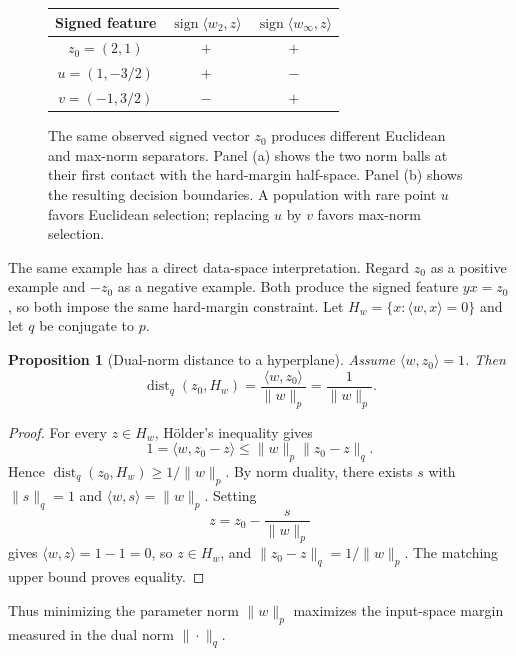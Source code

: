 \documentclass[11pt,twoside]{article}
\newcommand{\sign}{\operatorname{sign}}
\newtheorem{proposition}[theorem]{Proposition}
\theoremstyle{definition}
\theoremstyle{remark}
\begin{document}
\begin{figure}[H]
\begin{tabular}{c@{\qquad}cc}
\toprule
Signed feature & $\sign\langle w_2,z\rangle$
               & $\sign\langle w_\infty,z\rangle$\\
\midrule
$z_0=(2,1)$ & $+$ & $+$\\
$u=(1,-3/2)$ & $+$ & $-$\\
$v=(-1,3/2)$ & $-$ & $+$\\
\bottomrule
\end{tabular}
\caption{The same observed signed vector $z_0$ produces different
Euclidean and max-norm separators. Panel (a) shows the two norm balls at their
first contact with the hard-margin half-space. Panel (b) shows the resulting
decision boundaries. A population with rare point $u$ favors Euclidean
selection; replacing $u$ by $v$ favors max-norm selection.}
\label{fig:two-dimensional-reversal}
\end{figure}

The same example has a direct data-space interpretation. Regard $z_0$ as a
positive example and $-z_0$ as a negative example. Both produce the signed
feature $yx=z_0$, so both impose the same hard-margin constraint. Let
$H_w=\{x:\langle w,x\rangle=0\}$ and let $q$ be conjugate to $p$.
\begin{proposition}[Dual-norm distance to a hyperplane]
\label{prop:dual-distance-hyperplane}
Assume
$\langle w,z_0\rangle=1$. Then
\[
 \operatorname{dist}_q(z_0,H_w)
 =\frac{\langle w,z_0\rangle}{\|w\|_p}
 =\frac1{\|w\|_p}.
\]
\end{proposition}
\begin{proof}
For every $z\in H_w$, H\"older's inequality gives
\[
  1=\langle w,z_0-z\rangle
  \le \|w\|_p\|z_0-z\|_q.
\]
Hence $\operatorname{dist}_q(z_0,H_w)\ge 1/\|w\|_p$.
By norm duality, there exists $s$ with $\|s\|_q=1$ and
$\langle w,s\rangle=\|w\|_p$.  Setting
\[
  z=z_0-\frac{s}{\|w\|_p}
\]
gives $\langle w,z\rangle=1-1=0$, so $z\in H_w$, and
$\|z_0-z\|_q=1/\|w\|_p$. The matching upper bound proves equality.
\end{proof}
Thus minimizing the parameter norm $\|w\|_p$ maximizes the input-space margin
measured in the dual norm $\|\cdot\|_q$.
\end{document}
